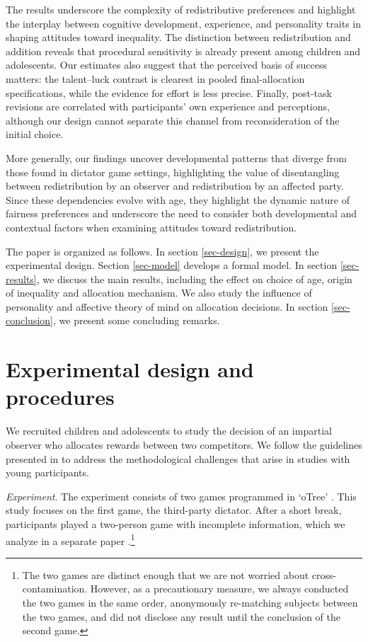 \documentclass[11pt]{article}
\begin{document}
The results underscore the complexity of redistributive preferences and highlight the interplay between cognitive development, experience, and personality traits in shaping attitudes toward inequality. The distinction between redistribution and addition reveals that procedural sensitivity is already present among children and adolescents. Our estimates also suggest that the perceived basis of success matters: the talent--luck contrast is clearest in pooled final-allocation specifications, while the evidence for effort is less precise. Finally, post-task revisions are correlated with participants' own experience and perceptions, although our design cannot separate this channel from reconsideration of the initial choice.

More generally, our findings uncover developmental patterns that diverge from those found in dictator game settings, highlighting the value of disentangling between redistribution by an observer and redistribution by an affected party. Since these dependencies evolve with age, they highlight the dynamic nature of fairness preferences and underscore the need to consider both developmental and contextual factors when examining attitudes toward redistribution.  
 
 
\enlargethispage{2\baselineskip}
The paper is organized as follows. In section \ref{sec-design}, we present the experimental design. Section \ref{sec-model} develops a formal model. In section \ref{sec-results}, we discuss the main results, including the effect on choice of age, origin of inequality and allocation mechanism. We also study the influence of personality and affective theory of mind on allocation decisions. In section \ref{sec-conclusion}, we present some concluding remarks. 
 
\section{Experimental design and procedures \label{sec-design}} 

We recruited children and adolescents to study the decision of an impartial observer who allocates rewards between two competitors. We follow the guidelines presented in \citet{brocas2019survey} to address the methodological challenges that arise in studies with young participants. \par \medskip

\emph{Experiment}. The experiment consists of two games programmed in `oTree' \citep{chen2016otree}. This study focuses on the first game, the third-party dictator. After a short break, participants played a two-person game with incomplete information, which we analyze in a separate paper \citep{alfonso2023development}.\footnote{The two games are distinct enough that we are not worried about cross-contamination. However, as a precautionary measure, we always conducted the two games in the same order, anonymously re-matching subjects between the two games, and did not disclose any result until the conclusion of the second game.} \par \medskip
  
\end{document}
